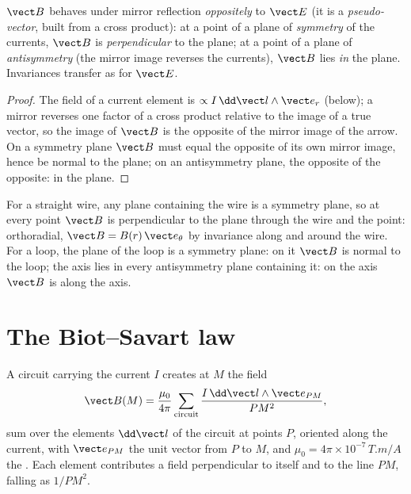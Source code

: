 \begin{proposition}\label{prop:b1:magnetostatics:symmetry}
$\vect B$ behaves under mirror reflection \emph{oppositely} to $\vect E$
(it is a \emph{pseudo-vector}, built from a cross product): at a point
of a plane of \emph{symmetry} of the currents, $\vect B$ is
\emph{perpendicular} to the plane; at a point of a plane of
\emph{antisymmetry} (the mirror image reverses the currents), $\vect B$
lies \emph{in} the plane. Invariances transfer as for $\vect E$.
\end{proposition}

\begin{proof}
The field of a current element is $\propto I\,\dd\vect l\wedge\vect e_r$
(below); a mirror reverses one factor of a cross product relative to the
image of a true vector, so the image of $\vect B$ is the opposite of the
mirror image of the arrow. On a symmetry plane $\vect B$ must equal the
opposite of its own mirror image, hence be normal to the plane; on an
antisymmetry plane, the opposite of the opposite: in the plane.
\end{proof}

\begin{example}\label{ex:b1:magnetostatics:symmetryuse}
For a straight wire, any plane containing the wire is a symmetry plane,
so at every point $\vect B$ is perpendicular to the plane through the
wire and the point: orthoradial, $\vect B = B(r)\,\vect e_\theta$ by
invariance along and around the wire. For a loop, the plane of the loop
is a symmetry plane: on it $\vect B$ is normal to the loop; the axis
lies in every antisymmetry plane containing it: on the axis $\vect B$ is
along the axis.
\end{example}

\section{The Biot--Savart law}

\begin{theorem}\label{thm:b1:magnetostatics:biotsavart}
A circuit carrying the current $I$ creates at $M$ the field
\[
\vect B(M) = \frac{\mu_0}{4\pi}\sum_{\text{circuit}} \frac{I\,\dd\vect l\wedge\vect e_{PM}}{PM^2} ,
\]
sum over the elements $\dd\vect l$ of the circuit at points $P$,
oriented along the current, with $\vect e_{PM}$ the unit vector from
$P$ to $M$, and $\mu_0 = 4\pi \times 10^{-7}\,\unit{T.m/A}$ the
\emph{}. Each element contributes a field
perpendicular to itself and to the line $PM$, falling as $1/PM^2$.
\end{theorem}
\admitted

